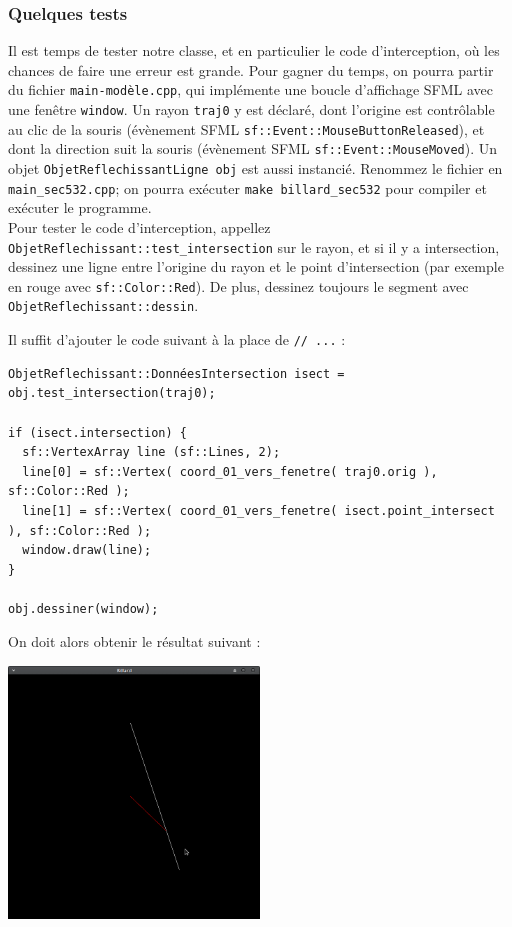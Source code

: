 \documentclass{book}
\newcommand{\inline}[1]{\texttt{#1}}
\def\filename{\texttt}
\begin{document}
\subsubsection{Quelques tests}

Il est temps de tester notre classe, et en particulier le code d'interception, où les chances de faire une erreur est grande. Pour gagner du temps, on pourra partir du fichier \filename{main-modèle.cpp}, qui implémente une boucle d'affichage SFML avec une fenêtre \inline{window}. Un rayon \inline{traj0} y est déclaré, dont l'origine est contrôlable au clic de la souris (évènement SFML \inline{sf::Event::MouseButtonReleased}), et dont la direction suit la souris (évènement SFML \inline{sf::Event::MouseMoved}). Un objet \inline{ObjetReflechissantLigne obj} est aussi instancié. Renommez le fichier en \filename{main\_sec532.cpp}; on pourra exécuter \texttt{make billard\_sec532} pour compiler et exécuter le programme.\\

Pour tester le code d'interception, appellez \inline{ObjetReflechissant::test_intersection} sur le rayon, et si il y a intersection, dessinez une ligne entre l'origine du rayon et le point d'intersection (par exemple en rouge avec \inline{sf::Color::Red}). De plus, dessinez toujours le segment avec \inline{ObjetReflechissant::dessin}.

\begin{correction}
Il suffit d'ajouter le code suivant à la place de \inline{// ...} :
\begin{verbatim}
ObjetReflechissant::DonnéesIntersection isect = obj.test_intersection(traj0);

if (isect.intersection) {
  sf::VertexArray line (sf::Lines, 2);
  line[0] = sf::Vertex( coord_01_vers_fenetre( traj0.orig ), sf::Color::Red );
  line[1] = sf::Vertex( coord_01_vers_fenetre( isect.point_intersect ), sf::Color::Red );
  window.draw(line);
}

obj.dessiner(window);
\end{verbatim}
\end{correction}

On doit alors obtenir le résultat suivant :
\begin{center}
\includegraphics[width=0.5\textwidth]{TD5/test-intersection.png}
\end{center}
\end{document}
